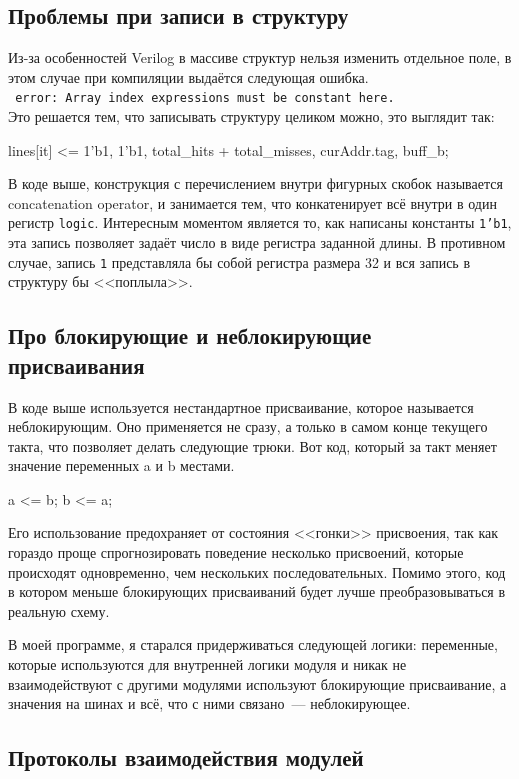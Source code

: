 \documentclass[14pt, russian, onesize]{extreport}
\begin{document}
\subsection*{ Проблемы при записи в структуру }
Из-за особенностей Verilog в массиве структур нельзя изменить
отдельное поле, в этом случае при компиляции выдаётся следующая ошибка.\\
\texttt{
error: Array index expressions must be constant here.
}\\
Это решается тем, что записывать структуру целиком можно, это выглядит
так: 
\begin{svcode}
    lines[it] <= {1'b1, 1'b1, total_hits + total_misses, curAddr.tag, buff_b};
\end{svcode}
В коде выше, конструкция с перечислением внутри фигурных скобок называется
concatenation operator, и занимается тем, что конкатенирует всё
внутри в один регистр \texttt{logic}. Интересным
моментом является то, как написаны константы \texttt{1'b1},
эта запись позволяет задаёт число в виде регистра заданной длины. В 
противном случае, запись \texttt{1} представляла бы собой 
регистра размера 32 и вся запись в структуру бы <<поплыла>>. 
\subsection*{ Про блокирующие и неблокирующие присваивания }
В коде выше используется нестандартное присваивание, которое называется
неблокирующим. Оно применяется не сразу, а только в самом конце текущего
такта, что позволяет делать следующие трюки. Вот код, который за такт
меняет значение переменных a и b местами.
\begin{svcode}
    a <= b;
    b <= a;
\end{svcode}

Его использование предохраняет от состояния <<гонки>> присвоения,
так как гораздо проще спрогнозировать поведение несколько присвоений, 
которые происходят одновременно, чем нескольких последовательных.
Помимо этого, код в котором меньше блокирующих присваиваний будет
лучше преобразовываться в реальную схему.

В моей программе, я старался
придерживаться следующей логики: переменные, которые используются
для внутренней логики модуля и никак не взаимодействуют
с другими модулями используют блокирующие присваивание, а значения
на шинах и всё, что с ними связано~--- неблокирующее. 

\subsection*{ Протоколы взаимодействия модулей }
\end{document}
